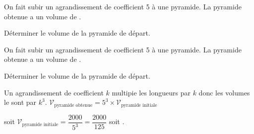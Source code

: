 \begin{exercice*}
    On fait subir un agrandissement de coefficient 5 à une pyramide.
    La pyramide obtenue a un volume de .
    
    Déterminer le volume de la pyramide de départ.
\end{exercice*}
\begin{corrige}
    On fait subir un agrandissement de coefficient 5 à une pyramide.
    La pyramide obtenue a un volume de .
    
    Déterminer le volume de la pyramide de départ.

    {\color{red}Un agrandissement de coefficient $k$ multipie les longueurs par $k$ donc les volumes le sont par $k^3$.
    $\mathcal{V}_{\text{pyramide obtenue}}=5^3\times\mathcal{V}_{\text{pyramide initiale}}$
    
    soit $\mathcal{V}_{\text{pyramide initiale}}=\dfrac{\num{2000}}{5^3}=\dfrac{\num{2000}}{125}$ soit .
    }
\end{corrige}
